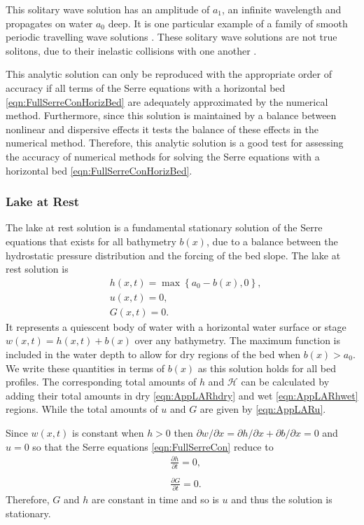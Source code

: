 This solitary wave solution has an amplitude of $a_1$, an infinite wavelength and propagates on water $a_0$ deep. It is one particular example of a family of smooth periodic travelling wave solutions \cite{El-etal-2006}. These solitary wave solutions are not true solitons, due to their inelastic collisions with one another \cite{Dutykh-etal-2013-761}. 

This analytic solution can only be reproduced with the appropriate order of accuracy if all terms of the Serre equations with a horizontal bed \eqref{eqn:FullSerreConHorizBed} are adequately approximated by the numerical method. Furthermore, since this solution is maintained by a balance between nonlinear and dispersive effects it tests the balance of these effects in the numerical method. Therefore, this analytic solution is a good test for assessing the accuracy of numerical methods for solving the Serre equations with a horizontal bed \eqref{eqn:FullSerreConHorizBed}.

\subsubsection{Lake at Rest}
The lake at rest solution is a fundamental stationary solution of the Serre equations that exists for all bathymetry $b(x)$, due to a balance between the hydrostatic pressure distribution and the forcing of the bed slope. The lake at rest solution is
\begin{subequations}
	\begin{align}
	&h(x,t) = \max\left\lbrace a_0 - b(x), 0 \right\rbrace, \\
	&u(x,t) = 0 , \\
	&G(x,t) = 0 .
	\end{align}
	\label{eqn:LARdefhub}
\end{subequations}
It represents a quiescent body of water with a horizontal water surface or stage $w(x,t) = h(x,t) + b(x)$ over any bathymetry. The maximum function is included in the water depth to allow for dry regions of the bed when $b(x) > a_0$. We write these quantities in terms of $b(x)$ as this solution holds for all bed profiles. The corresponding total amounts of $h$ and $\mathcal{H}$ can be calculated by adding their total amounts in dry \eqref{eqn:AppLARhdry} and wet \eqref{eqn:AppLARhwet} regions. While the total amounts of $u$ and $G$ are given by \eqref{eqn:AppLARu}. 

Since $w(x,t)$ is constant when $h> 0$ then $\partial w / \partial x = \partial h / \partial x + \partial b / \partial x = 0 $ and $u=0$ so that the Serre equations \eqref{eqn:FullSerreCon} reduce to
\begin{align*}
& \frac{\partial h}{\partial t}  = 0 , \\  \nonumber \\
&\frac{\partial G}{\partial t}  = 0.
\end{align*}
Therefore, $G$ and $h$ are constant in time and so is $u$ and thus the solution is stationary.

